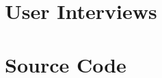 \chapter{User Interviews}

\label{appendix_user_interviews}

\chapter{Source Code}

\label{appendix_source_code}
